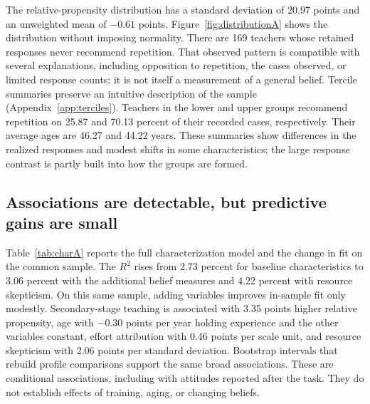 The relative-propensity distribution has a standard deviation of 20.97 points and an unweighted mean of $-0.61$ points. Figure~\ref{fig:distributionA} shows the distribution without imposing normality. There are 169 teachers whose retained responses never recommend repetition. That observed pattern is compatible with several explanations, including opposition to repetition, the cases observed, or limited response counts; it is not itself a measurement of a general belief.
Tercile summaries preserve an intuitive description of the sample (Appendix~\ref{app:terciles}). Teachers in the lower and upper groups recommend repetition on 25.87 and 70.13 percent of their recorded cases, respectively. Their average ages are 46.27 and 44.22 years. These summaries show differences in the realized responses and modest shifts in some characteristics; the large response contrast is partly built into how the groups are formed.

\subsection{Associations are detectable, but predictive gains are small}
Table~\ref{tab:charA} reports the full characterization model and the change in fit on the common sample. The $R^2$ rises from 2.73 percent for baseline characteristics to 3.06 percent with the additional belief measures and 4.22 percent with resource skepticism. On this same sample, adding variables improves in-sample fit only modestly.
Secondary-stage teaching is associated with 3.35 points higher relative propensity, age with $-0.30$ points per year holding experience and the other variables constant, effort attribution with 0.46 points per scale unit, and resource skepticism with 2.06 points per standard deviation. Bootstrap intervals that rebuild profile comparisons support the same broad associations. These are conditional associations, including with attitudes reported after the task. They do not establish effects of training, aging, or changing beliefs.

